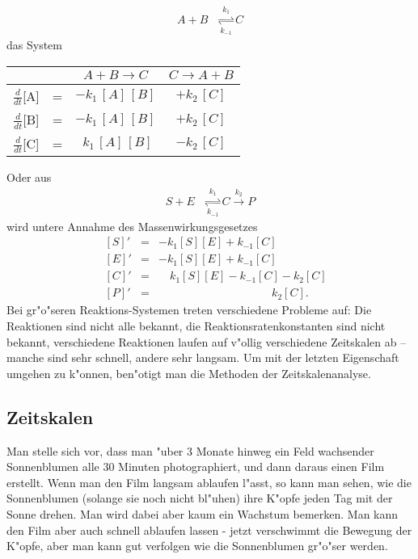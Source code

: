 \begin{eqnarray*}
A + B    & \mathop{\rightleftharpoons}\limits_{k_{-1}}^{k_1}  C  
\end{eqnarray*}
das System
\begin{center}
\begin{tabular}{cl|c|c}
 && $A+B\rightarrow C$ & $C\rightarrow A+B$\\
\hline
$\frac d {dt}$[A] &=& $- k_1\,[A]\,[B]$&$+k_2\,[C]$\\
$\frac d {dt}$[B] &=& $- k_1\,[A]\,[B]$&$+k_2\,[C]$\\
$\frac d {dt}$[C] &=& $\,\, k_1\,[A]\,[B]$&$-k_2\,[C]$
\end{tabular}
\end{center}
Oder aus 
\begin{eqnarray*}
S + E    & \mathop{\rightleftharpoons}\limits_{k_{-1}}^{k_1}  C  \mathop{\rightarrow}\limits^{k_2} P
\end{eqnarray*}
wird untere Annahme des Massenwirkungsgesetzes
\begin{eqnarray*}
\quad [S]' & = & -k_1 [S][E]+ k_{-1} [C]\\
 \quad[E]' & = &  -k_1 [S][E]+ k_{-1} [C]\\
\quad [C]' & = &  \quad k_1 [S][E]- k_{-1} [C] - k_2 [C]\\
\quad [P]' & = & \qquad\qquad\qquad\qquad\qquad k_2 [C].
\end{eqnarray*}
Bei gr"o"seren Reaktions-Systemen treten verschiedene Probleme auf: Die Reaktionen sind nicht alle bekannt,
die Reaktionsratenkonstanten sind nicht bekannt, verschiedene Reaktionen laufen auf v"ollig verschiedene
Zeitskalen ab -- manche sind sehr schnell, andere sehr langsam. 
Um mit der letzten Eigenschaft umgehen zu k"onnen, ben"otigt man die Methoden der Zeitskalenanalyse.
\subsection{Zeitskalen}
Man stelle sich vor, dass man "uber 3 Monate hinweg ein Feld wachsender 
Sonnenblumen alle 30 Minuten photographiert, und dann daraus einen Film
erstellt. Wenn man den Film langsam ablaufen l"asst, so kann man sehen, wie 
die Sonnenblumen (solange sie noch nicht bl"uhen) ihre K"opfe jeden Tag mit der 
Sonne drehen. Man wird dabei aber kaum ein Wachstum bemerken. Man kann 
den Film aber auch schnell ablaufen lassen - jetzt verschwimmt die Bewegung der K"opfe,
aber man kann gut verfolgen wie die Sonnenblumen gr"o"ser werden.


